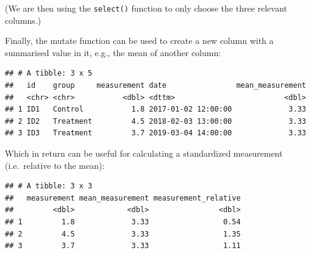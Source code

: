 \documentclass[
  12pt,
  krantz2]{krantz}
\makeatletter
\newenvironment{Shaded}{\begin{snugshade}}{\end{snugshade}}
\newcommand{\DataTypeTok}[1]{\textcolor[rgb]{0.13,0.29,0.53}{#1}}
\newcommand{\KeywordTok}[1]{\textcolor[rgb]{0.13,0.29,0.53}{\textbf{#1}}}
\newcommand{\NormalTok}[1]{#1}
\newcommand{\OperatorTok}[1]{\textcolor[rgb]{0.81,0.36,0.00}{\textbf{#1}}}
\newcommand{\StringTok}[1]{\textcolor[rgb]{0.31,0.60,0.02}{#1}}
\newenvironment{kframe}{%
\medskip{}
\setlength{\fboxsep}{.8em}
 \def\at@end@of@kframe{}%
 \ifinner\ifhmode%
  \def\at@end@of@kframe{\end{minipage}}%
  \begin{minipage}{\columnwidth}%
 \fi\fi%
 \def\FrameCommand##1{\hskip\@totalleftmargin \hskip-\fboxsep
 \colorbox{shadecolor}{##1}\hskip-\fboxsep
     \hskip-\linewidth \hskip-\@totalleftmargin \hskip\columnwidth}%
 \MakeFramed {\advance\hsize-\width
   \@totalleftmargin\z@ \linewidth\hsize
   \@setminipage}}%
 {\par\unskip\endMakeFramed%
 \at@end@of@kframe}
\renewenvironment{Shaded}{\begin{kframe}}{\end{kframe}}
\makeatother
\begin{document}
(We are then using the \texttt{select()} function to only choose the three relevant columns.)

Finally, the mutate function can be used to create a new column with a summarised value in it, e.g., the mean of another column:

\begin{Shaded}
\end{Shaded}

\begin{verbatim}
## # A tibble: 3 x 5
##   id    group     measurement date                mean_measurement
##   <chr> <chr>           <dbl> <dttm>                         <dbl>
## 1 ID1   Control           1.8 2017-01-02 12:00:00             3.33
## 2 ID2   Treatment         4.5 2018-02-03 13:00:00             3.33
## 3 ID3   Treatment         3.7 2019-03-04 14:00:00             3.33
\end{verbatim}

Which in return can be useful for calculating a standardized measurement (i.e.~relative to the mean):

\begin{Shaded}
\end{Shaded}

\begin{verbatim}
## # A tibble: 3 x 3
##   measurement mean_measurement measurement_relative
##         <dbl>            <dbl>                <dbl>
## 1         1.8             3.33                 0.54
## 2         4.5             3.33                 1.35
## 3         3.7             3.33                 1.11
\end{verbatim}
\end{document}

